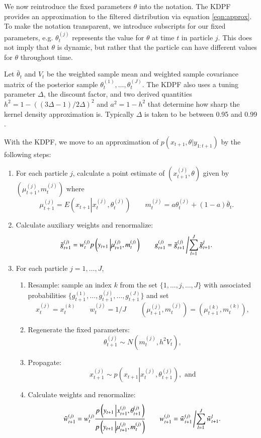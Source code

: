 \documentclass{elsarticle}
\begin{document}
We now reintroduce the fixed parameters $\theta$ into the notation. The KDPF provides an approximation to the filtered distribution via equation \eqref{eqn:approx}. To make the notation transparent, we introduce subscripts for our fixed parameters, e.g. $\theta_t^{(j)}$ represents the value for $\theta$ at time $t$ in particle $j$. This does not imply that $\theta$ is dynamic, but rather that the particle can have different values for $\theta$ throughout time.

Let $\bar{\theta}_t$ and $V_t$ be the weighted sample mean and weighted sample covariance matrix of the posterior sample $\theta_t^{(1)},\ldots,\theta_t^{(J)}$.  The KDPF also uses a tuning parameter $\Delta$, the discount factor, and two derived quantities $h^2 = 1 - ((3\Delta - 1)/2\Delta)^2$ and $a^2 = 1 - h^2$ that determine how sharp the kernel density approximation is. Typically $\Delta$ is taken to be between 0.95 and 0.99 \citep{Liu:West:comb:2001}.

With the KDPF, we move to an approximation of $p(x_{t+1},\theta|y_{1:t+1})$ by the following steps:

\begin{enumerate}
\item For each particle $j$, calculate a point estimate of $\left(x_{t+1}^{(j)},\theta\right)$ given by $\left(\mu_{t+1}^{(j)},m_t^{(j)}\right)$ where
    \[
    \mu_{t+1}^{(j)} = E\left(x_{t+1}\left|x_t^{(j)},\theta_t^{(j)} \right.\right) \qquad
    m_t^{(j)} = a\theta_t^{(j)} + (1-a)\bar{\theta}_t.
    \]
\item Calculate auxiliary weights and renormalize:
\[ \tilde{g}_{t+1}^{(j)} = w_t^{(j)} p\left(y_{t+1}\left|\mu_{t+1}^{(j)},m_t^{(j)}\right.\right) \qquad g_{t+1}^{(j)} = \tilde{g}_{t+1}^{(j)}\left/ \sum_{l=1}^J \tilde{g}_{t+1}^l. \right. \]
\item For each particle $j=1,\ldots,J$,
	\begin{enumerate}
    \item Resample: sample an index $k$ from the set $\{1,\ldots,j,\ldots,J\}$ with associated probabilities $\{g_{t+1}^{(1)},\ldots,g_{t+1}^{(j)},\ldots,g_{t+1}^{(J)}\}$ and set \[x_t^{(j)} = x_t^{(k)} \qquad w_t^{(j)} = 1 / J \qquad \left(\mu_{t+1}^{(j)},m_t^{(j)}\right) = \left(\mu_{t+1}^{(k)},m_t^{(k)}\right),\]
	\item Regenerate the fixed parameters:
	\[ \theta_{t+1}^{(j)} \sim N\left( m_t^{(j)}, h^2V_t \right), \]
	\item Propagate:
	\[ x_{t+1}^{(j)} \sim p\left(x_{t+1}\left|x_t^{(j)},\theta_{t+1}^{(j)}\right.\right), \mbox{ and} \]
	\item Calculate weights and renormalize:
	\[ \tilde{w}_{t+1}^{(j)} = w_t^{(j)}\frac{p\left(y_{t+1}\left|x_{t+1}^{(j)},\theta_{t+1}^{(j)}\right.\right)}{p\left(y_{t+1}\left|\mu_{t+1}^{(j)},m_t^{(j)}\right.\right)}
	\qquad
	w_{t+1}^{(j)} = \tilde{w}_{t+1}^{(j)}\left/\sum_{l=1}^J \tilde{w}_{t+1}^l. \right. \]
	\end{enumerate}
\end{enumerate}
\end{document}
